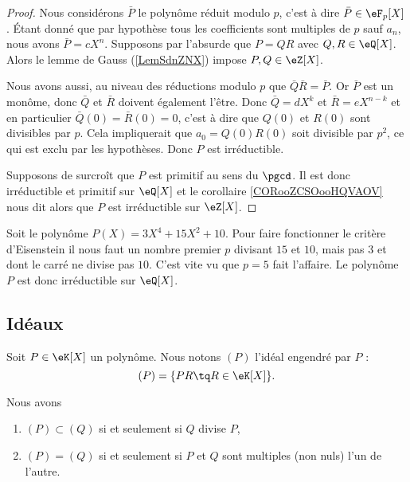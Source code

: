 \begin{proof}
    Nous considérons \( \bar P\) le polynôme réduit modulo \( p\), c'est à dire \( \bar P\in \eF_p[X]\). Étant donné que par hypothèse tous les coefficients sont multiples de \( p\) sauf \( a_n\), nous avons \( \bar P=cX^n\). Supposons par l'absurde que \( P=QR\) avec \( Q,R\in \eQ[X]\). Alors le lemme de Gauss (\ref{LemSdnZNX}) impose \( P,Q\in \eZ[X]\).

    Nous avons aussi, au niveau des réductions modulo \( p\) que $\bar Q\bar R=\bar P$. Or \( \bar P\) est un monôme, donc \( \bar Q\) et \( \bar R\) doivent également l'être. Donc \( \bar Q=dX^k\) et \( \bar R=eX^{n-k}\) et en particulier \( \bar Q(0)=\bar R(0)=0\), c'est à dire que \( Q(0)\) et \( R(0)\) sont divisibles par \( p\). Cela impliquerait que \( a_0=Q(0)R(0)\) soit divisible par \( p^2\), ce qui est exclu par les hypothèses. Donc \( P\) est irréductible.

    Supposons de surcroît que \( P\) est primitif au sens du \( \pgcd\). Il est donc irréductible et primitif sur \( \eQ[X]\) et le corollaire \ref{CORooZCSOooHQVAOV} nous dit alors que \( P\) est irréductible sur \( \eZ[X]\).
\end{proof}

\begin{example}
    Soit le polynôme \( P(X)=3X^4+15 X^2+10\). Pour faire fonctionner le critère d'Eisenstein il nous faut un nombre premier \( p\) divisant \( 15\) et \( 10\), mais pas \( 3\) et dont le carré ne divise pas \( 10\). C'est vite vu que \( p=5\) fait l'affaire. Le polynôme \( P\) est donc irréductible sur \( \eQ[X]\).
\end{example}

\subsection{Idéaux}

Soit \( P\in \eK[X]\) un polynôme. Nous notons \( (P)\) l'idéal engendré par \( P\) :
\begin{equation}        \label{EqDefxMkDtW}
    (P)=\{ PR\tq R\in\eK[X] \}.
\end{equation}

\begin{lemma}
    Nous avons
    \begin{enumerate}
        \item
            \( (P)\subset (Q)\) si et seulement si \( Q\) divise \( P\),
        \item
            \( (P)=(Q)\) si et seulement si \( P\) et \( Q\) sont multiples (non nuls) l'un de l'autre.
    \end{enumerate}
\end{lemma}


